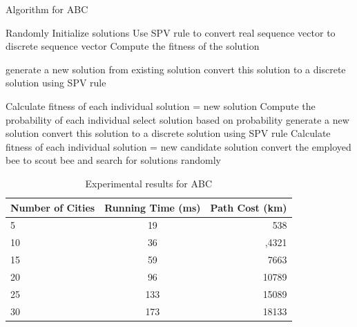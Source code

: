 \documentclass[conference]{IEEEtran}
\begin{document}
\begin{algorithm}[H]
\caption{Algorithm for ABC}
\begin{algorithmic}[1]
\STATE Randomly Initialize solutions
\STATE Use SPV rule to convert real sequence vector to discrete sequence vector
\ENDFOR 
\STATE Compute the fitness of the solution
\ENDFOR 

\REPEAT
{}

\STATE generate a new solution from existing solution
\STATE convert this solution to a discrete solution using SPV rule
\ENDFOR 


\STATE Calculate fitness of each individual
\STATE solution = new solution
\ENDIF
\ENDFOR
\STATE Compute the probability of each individual
\STATE select solution based on probability
\STATE generate a new solution
\STATE convert this solution to a discrete solution using SPV rule
\ENDFOR
\STATE Calculate fitness of each individual
\STATE solution = new candidate solution
\ENDIF
\ENDFOR
{}
\STATE convert the employed bee to scout bee and search for solutions randomly
\ENDIF

\end{algorithmic}
\end{algorithm}



\begin{table}[h!]
  \begin{center}
    
    \begin{tabular}{l|c|r}
      \textbf{Number of Cities} & \textbf{Running Time (ms)} & \textbf{Path Cost (km)}\\
      \hline
      5 & 19 & 538\\
      10 & 36& ,4321\\
      15 & 59  & 7663\\
      20 & 96  & 10789\\ 
      25 & 133 & 15089\\
      30 & 173  & 18133\\
    \end{tabular}

    \caption{Experimental results for ABC}
  \end{center}
\end{table}
\end{document}
